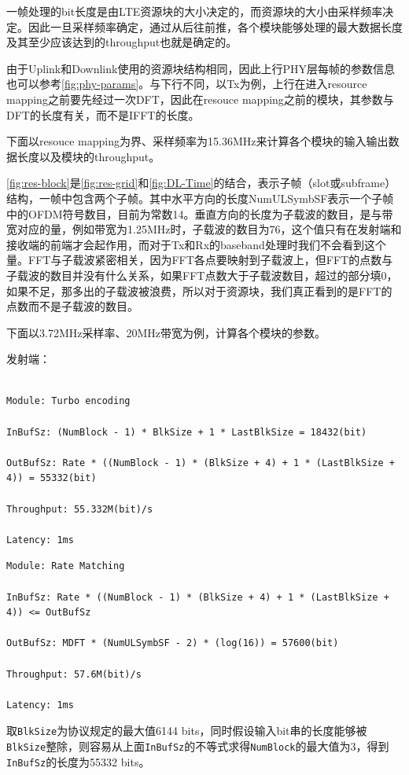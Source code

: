 \documentclass[titlepage]{article}
\numberwithin{figure}{section}
\numberwithin{equation}{section}
\begin{document}
一帧处理的bit长度是由LTE资源块的大小决定的，而资源块的大小由采样频率决定。因此一旦采样频率确定，通过从后往前推，各个模块能够处理的最大数据长度及其至少应该达到的throughput也就是确定的。

由于Uplink和Downlink使用的资源块结构相同，因此上行PHY层每帧的参数信息也可以参考\ref{fig:phy-params}。与下行不同，以Tx为例，上行在进入resource mapping之前要先经过一次DFT，因此在resouce mapping之前的模块，其参数与DFT的长度有关，而不是IFFT的长度。

下面以resouce mapping为界、采样频率为15.36MHz来计算各个模块的输入输出数据长度以及模块的throughput。

\ref{fig:res-block}是\ref{fig:res-grid}和\ref{fig:DL-Time}的结合，表示子帧（slot或subframe）结构，一帧中包含两个子帧。其中水平方向的长度NumULSymbSF表示一个子帧中的OFDM符号数目，目前为常数14。垂直方向的长度为子载波的数目，是与带宽对应的量，例如带宽为1.25MHz时，子载波的数目为76，这个值只有在发射端和接收端的前端才会起作用，而对于Tx和Rx的baseband处理时我们不会看到这个量。FFT与子载波紧密相关，因为FFT各点要映射到子载波上，但FFT的点数与子载波的数目并没有什么关系，如果FFT点数大于子载波数目，超过的部分填0，如果不足，那多出的子载波被浪费，所以对于资源块，我们真正看到的是FFT的点数而不是子载波的数目。

下面以3.72MHz采样率、20MHz带宽为例，计算各个模块的参数。

发射端：

\begin{verbatim}

Module: Turbo encoding

InBufSz: (NumBlock - 1) * BlkSize + 1 * LastBlkSize = 18432(bit)

OutBufSz: Rate * ((NumBlock - 1) * (BlkSize + 4) + 1 * (LastBlkSize + 4)) = 55332(bit)

Throughput: 55.332M(bit)/s

Latency: 1ms
\end{verbatim}

\begin{verbatim}
Module: Rate Matching

InBufSz: Rate * ((NumBlock - 1) * (BlkSize + 4) + 1 * (LastBlkSize + 4)) <= OutBufSz

OutBufSz: MDFT * (NumULSymbSF - 2) * (log(16)) = 57600(bit)

Throughput: 57.6M(bit)/s

Latency: 1ms
\end{verbatim}

取\verb|BlkSize|为协议规定的最大值6144 bits，同时假设输入bit串的长度能够被\verb|BlkSize|整除，则容易从上面\verb|InBufSz|的不等式求得\verb|NumBlock|的最大值为3，得到\verb|InBufSz|的长度为55332 bits。
\end{document}
